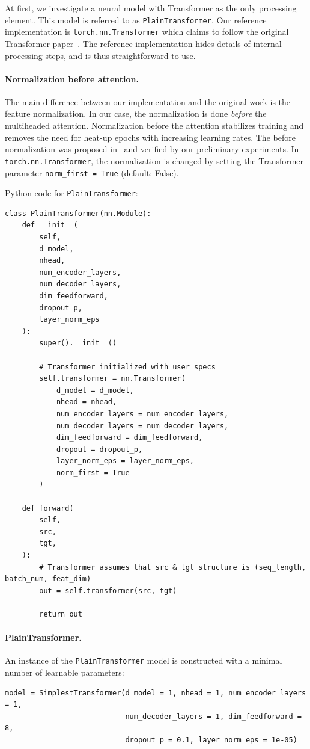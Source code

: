 \documentclass[final]{article}
\begin{document}
At first, we investigate a neural model with Transformer as the only processing element.
This model is referred to as \texttt{PlainTransformer}. Our reference implementation is \texttt{torch.nn.Transformer} which claims to follow the original Transformer paper~\cite{transformer}. The reference implementation hides details of internal processing steps, and is thus straightforward to use.

\paragraph{Normalization before attention.} The main difference between our implementation and  the original work is the feature normalization. In our case, the normalization is done \textit{before} the multiheaded attention. Normalization before the attention stabilizes training and removes the need for heat-up epochs with
increasing learning rates. The before normalization was proposed
in~\cite{Xiong-2020-icml} and verified by our preliminary experiments. In \texttt{torch.nn.Transformer}, the normalization is changed by
setting the Transformer parameter \texttt{norm\_first = True} (default: False).

Python code for \texttt{PlainTransformer}:
\begin{lstlisting}
class PlainTransformer(nn.Module):
    def __init__(
        self,
        d_model,
        nhead,
        num_encoder_layers,
        num_decoder_layers,
        dim_feedforward,
        dropout_p,
        layer_norm_eps
    ):
        super().__init__()

        # Transformer initialized with user specs
        self.transformer = nn.Transformer(
            d_model = d_model,
            nhead = nhead,
            num_encoder_layers = num_encoder_layers,
            num_decoder_layers = num_decoder_layers,
            dim_feedforward = dim_feedforward,
            dropout = dropout_p,
            layer_norm_eps = layer_norm_eps,
            norm_first = True
        )

    def forward(
        self,
        src,
        tgt,
    ):
        # Transformer assumes that src & tgt structure is (seq_length, batch_num, feat_dim)
        out = self.transformer(src, tgt)

        return out
\end{lstlisting}

\paragraph{PlainTransformer.}
An instance of the \texttt{PlainTransformer} model is constructed
with a minimal number of learnable parameters:
\begin{lstlisting}
model = SimplestTransformer(d_model = 1, nhead = 1, num_encoder_layers = 1,
                            num_decoder_layers = 1, dim_feedforward = 8,
                            dropout_p = 0.1, layer_norm_eps = 1e-05)
\end{lstlisting}
\end{document}
